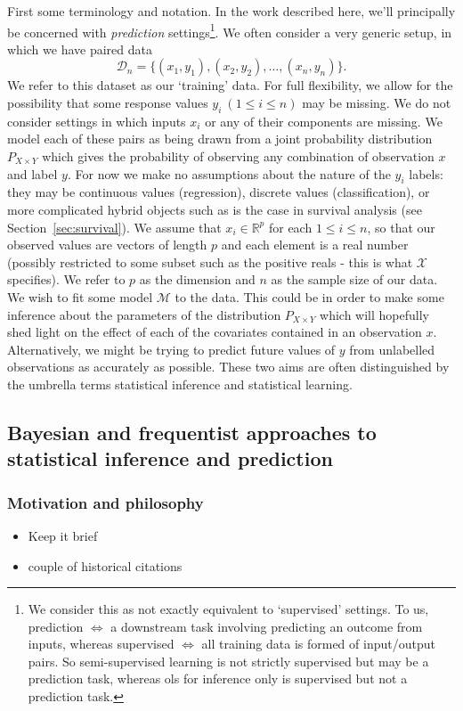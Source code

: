 \documentclass[thesis.tex]{subfiles}
\begin{document}
First some terminology and notation. In the work described here, we'll principally be concerned with \emph{prediction} settings\footnote{We consider this as not exactly equivalent to `supervised' settings. To us, prediction $\Leftrightarrow$ a downstream task involving predicting an outcome from inputs, whereas supervised $\Leftrightarrow$ all training data is formed of input/output pairs. So semi-supervised learning is not strictly supervised but may be a prediction task, whereas \gls{ols} for inference only is supervised but not a prediction task.}. We often consider a very generic setup, in which we have paired data
\[\mathcal{D}_n = \{(x_1, y_1), (x_2, y_2), \dots, (x_n, y_n)\}.\] 
We refer to this dataset as our `training' data. For full flexibility, we allow for the possibility that some response values $y_i \ (1 \leq i \leq n)$ may be missing. We do not consider settings in which inputs $x_i$ or any of their components are missing. We model each of these pairs as being drawn from a joint probability distribution $P_{X \times Y}$ which gives the probability of observing any combination of observation $x$ and label $y$. For now we make no assumptions about the nature of the $y_i$ labels: they may be continuous values (regression), discrete values (classification), or more complicated hybrid objects such as is the case in survival analysis (see Section~\ref{sec:survival}). We assume that $x_i \in \mathbb{R}^p$ for each $1 \leq i \leq n$, so that our observed values are vectors of length $p$ and each element is a real number (possibly restricted to some subset such as the positive reals - this is what $\mathcal{X}$ specifies). We refer to $p$ as the dimension and $n$ as the sample size of our data. We wish to fit some model $\mathcal{M}$ to the data. This could be in order to make some inference about the parameters of the distribution $P_{X \times Y}$ which will hopefully shed light on the effect of each of the covariates contained in an observation $x$. Alternatively, we might be trying to predict future values of $y$ from unlabelled observations as accurately as possible. These two aims are often distinguished by the umbrella terms statistical inference and statistical learning.


\subsection{Bayesian and frequentist approaches to statistical inference and prediction}
\subsubsection{Motivation and philosophy}
{\color{red} \begin{itemize}
    \item Keep it brief
    \item couple of historical citations
\end{itemize}}
\end{document}
